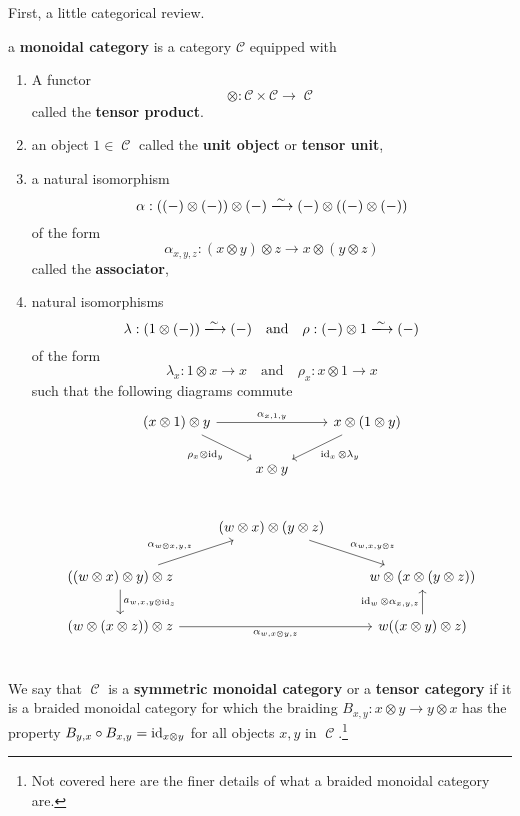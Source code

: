 \documentclass[11pt]{article}
\DeclareMathOperator{\CC}{\mathcal{C}}
\begin{document}
First, a little categorical review.
\begin{defn}\label{monoidcat}
a \textbf{monoidal category} is a category $\mathcal{C}$ equipped with
\begin{enumerate}[1.]
\item A functor 
	\[
		\otimes: \mathcal{C} \times \mathcal{C} \to \CC
	\]called the \textbf{tensor product}.

\item an object $1 \in \CC$ called the \textbf{unit object} or \textbf{tensor unit},
\item a natural isomorphism 
\[
	\alpha: ((-)\otimes(-))\otimes(-) \xlongrightarrow{\sim} (-)\otimes((-)\otimes(-))
\]
of the form
\[
	\alpha_{x,y,z}: (x \otimes y) \otimes z \to x \otimes (y \otimes z)
\] 
called the \textbf{associator},
\item natural isomorphisms
\[
	\lambda: (1 \otimes (-)) \xlongrightarrow{\sim} (-) \quad \text{and} \quad \rho: (-) \otimes 1 \xlongrightarrow{\sim}(-)
\]
of the form 
\[
	\lambda_x: 1 \otimes x \to x \quad \text{and} \quad \rho_x: x \otimes 1 \to x
\]
such that the following diagrams commute
\[
\begin{tikzcd}
(x \otimes 1) \otimes y  \ar[dr,"\rho_x \otimes \id_y"']\ar[rr, "\alpha_{x,1,y}"] &   & x \otimes (1 \otimes y) \ar[ld, "\id_x \otimes \lambda_y"]\\
  & x \otimes y &  \\
\end{tikzcd}
\]
\[\begin{tikzcd}
  & (w \otimes x) \otimes (y \otimes z) \ar[rd, "\alpha_{w,x,y \otimes z}"] &  \\
	((w \otimes x) \otimes y) \otimes z \ar[ur, "\alpha_{w \otimes x, y ,z}"] \ar[d, "a_{w,x,y \otimes \id_z}"] &   & w \otimes (x \otimes (y \otimes z)) \\
	(w \otimes ( x \otimes z)) \otimes z \ar[rr, "\alpha_{w,x \otimes y, z}"']  &   & w((x \otimes y) \otimes z) \ar[u, "\id_w \otimes \alpha_{x,y,z}"]  \\
\end{tikzcd}\]
\end{enumerate}
We say that $\CC$ is a \textbf{symmetric monoidal category} or a \textbf{tensor category} if it is a braided monoidal category for which the braiding $B_{x,y}: x \otimes y \to y \otimes x$ has the property $B_{y,x}\circ B_{x,y} = \operatorname{id}_{x \otimes y}$ for all objects $x,y$ in $\CC$.\footnote{Not covered here are the finer details of what a braided monoidal category are.}
\end{defn}
\end{document}
